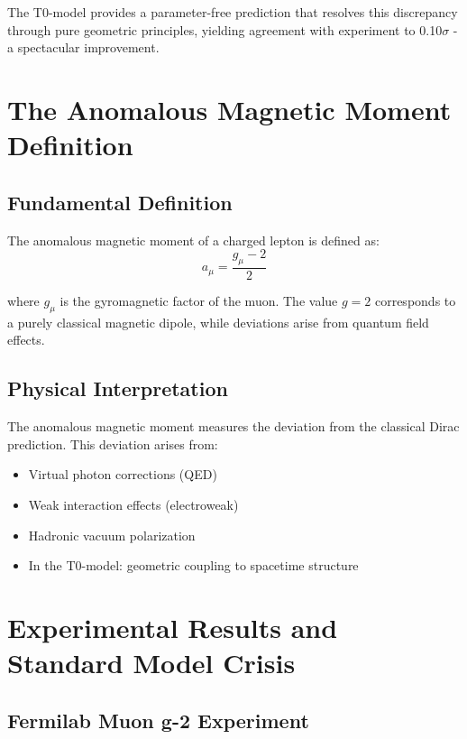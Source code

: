 \documentclass[12pt,a4paper]{report}
\begin{document}
	The T0-model provides a parameter-free prediction that resolves this discrepancy through pure geometric principles, yielding agreement with experiment to 0.10$\sigma$ - a spectacular improvement.
	
	\section{The Anomalous Magnetic Moment Definition}
	\label{sec:anomalous_moment_definition}
	
	\subsection{Fundamental Definition}
	\label{subsec:fundamental_definition}
	
	The anomalous magnetic moment of a charged lepton is defined as:
	\begin{equation}
		a_\mu = \frac{g_\mu - 2}{2}
		\label{eq:anomalous_moment_definition}
	\end{equation}
	
	where $g_\mu$ is the gyromagnetic factor of the muon. The value $g = 2$ corresponds to a purely classical magnetic dipole, while deviations arise from quantum field effects.
	
	\subsection{Physical Interpretation}
	\label{subsec:physical_interpretation}
	
	The anomalous magnetic moment measures the deviation from the classical Dirac prediction. This deviation arises from:
	\begin{itemize}
		\item Virtual photon corrections (QED)
		\item Weak interaction effects (electroweak)
		\item Hadronic vacuum polarization
		\item In the T0-model: geometric coupling to spacetime structure
	\end{itemize}
	
	\section{Experimental Results and Standard Model Crisis}
	\label{sec:experimental_results}
	
	\subsection{Fermilab Muon g-2 Experiment}
	\label{subsec:fermilab_results}
	
\end{document}

